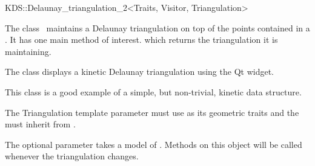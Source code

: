 

\begin{ccRefClass}{KDS::Delaunay_triangulation_2<Traits, Visitor, Triangulation>}  %


\ccDefinition
  
The class \ccRefName\ maintains a Delaunay triangulation on top of the
points contained in a . It has one main method
of interest.  which returns the triangulation it
is maintaining. 

The class  displays a kinetic
Delaunay triangulation using the Qt widget.

This class is a good example of a simple, but non-trivial, kinetic data structure. 

The Triangulation template parameter must use
 as its geometric traits and the
 must inherit from .

The optional  parameter takes a model of
. Methods on this object will be called
whenever the triangulation changes.



\ccTypes


\ccCreation
{}  %



\end{ccRefClass}
